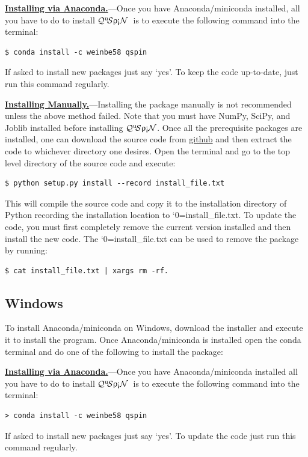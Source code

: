 \documentclass{SciPost}
\newcommand\0{\scalebox{-1}[1]{0}}
\let\svttfamily\ttfamily
\renewcommand\ttfamily{\svttfamily\catcode`0=\active }
\renewcommand\texttt{\bgroup\ttfamily\texttthelp}
\def\texttthelp#1{#1\egroup}
\newcommand{\qspin}{$\mathcal{Q}^{\mathrm{u}}\!\mathcal{S}\uprho\mathrm{\text{\textexclamdown}}\mathcal{N}$}
\begin{document}
\begin{appendix}
\underline{\bf Installing via Anaconda.}---Once you have Anaconda/miniconda installed, all you have to do to install \qspin\ is to execute the following command into the terminal: 
\begin{lstlisting}[numbers=none]
$ conda install -c weinbe58 qspin
\end{lstlisting}
If asked to install new packages just say `yes'. To keep the code up-to-date, just run this command regularly. 

\underline{\bf Installing Manually.}---Installing the package manually is not recommended unless the above method failed. Note that you must have NumPy, SciPy, and Joblib installed before installing \qspin. Once all the prerequisite packages are installed, one can download the source code from \href{https://github.com/weinbe58/qspin/tree/master}{github} and then extract the code to whichever directory one desires. Open the terminal and go to the top level directory of the source code and execute:
\begin{lstlisting}[numbers=none]  
$ python setup.py install --record install_file.txt
\end{lstlisting}
This will compile the source code and copy it to the installation directory of Python recording the installation location to \texttt{install\_file.txt}. To update the code, you must first completely remove the current version installed and then install the new code. The \texttt{install\_file.txt} can be used to remove the package by running:  
\begin{lstlisting}[numbers=none]  
$ cat install_file.txt | xargs rm -rf. 
\end{lstlisting}

\subsection{Windows}
To install Anaconda/miniconda on Windows, download the installer and execute it to install the program. Once Anaconda/miniconda is installed open the conda terminal and do one of the following to install the package:

\underline{\bf Installing via Anaconda.}---Once you have Anaconda/miniconda installed all you have to do to install \qspin\ is to execute the following command into the terminal: 
\begin{lstlisting}[numbers=none]
> conda install -c weinbe58 qspin
\end{lstlisting}
If asked to install new packages just say `yes'. To update the code just run this command regularly. 


\end{appendix}
\end{document}
